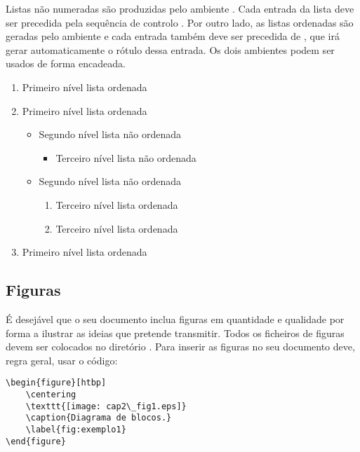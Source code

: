 Listas não numeradas são produzidas pelo ambiente . Cada entrada da lista deve ser precedida pela sequência de controlo . Por outro lado, as listas ordenadas são geradas pelo ambiente  e cada entrada também deve ser precedida de , que irá gerar automaticamente o rótulo dessa entrada. Os dois ambientes podem ser usados de forma encadeada.

\clearpage
\begin{enumerate}
   \item Primeiro nível lista ordenada
   \item Primeiro nível lista ordenada
   \begin{itemize}
     \item Segundo nível lista não ordenada
     \begin{itemize}
       \item Terceiro nível lista não ordenada
     \end{itemize}      
     \item Segundo nível lista não ordenada
     \begin{enumerate}
       \item Terceiro nível lista ordenada
       \item Terceiro nível lista ordenada
     \end{enumerate}    
   \end{itemize}
   \item Primeiro nível lista ordenada   
\end{enumerate} 


\subsection{Figuras}

É desejável que o seu documento inclua figuras em quantidade e qualidade por forma a ilustrar as ideias que pretende transmitir. Todos os ficheiros de figuras devem ser colocados no diretório . Para inserir as figuras no seu documento deve, regra geral, usar o código:

\begin{verbatim}
\begin{figure}[htbp]
	\centering
	\texttt{[image: cap2\_fig1.eps]}
	\caption{Diagrama de blocos.}
	\label{fig:exemplo1}
\end{figure}
\end{verbatim}

